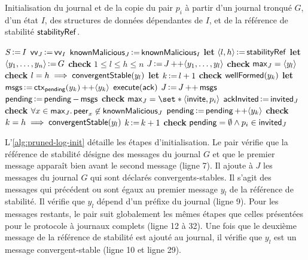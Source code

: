 \begin{algorithm}[ht]
\caption[Initialisation à partir d'un journal tronqué et d'un état]{Initialisation du journal et de la copie du pair $p_i$ à partir d'un journal tronqué $G$, d'un état $I$, des structures de données dépendantes de $I$, et de la référence de stabilité $\trm{stabilityRef}$.}\label{alg:pruned-log-init}
\begin{algorithmic}[1]
    \State $S \assign I$
    \State $\trm{vv}_J \assign \trm{vv}_I$
    \State $\trm{knownMalicious}_J \assign \trm{knownMalicious}_I$
    \State \textbf{let} $\tuple*{l,h} \assign \trm{stabilityRef}$
    \State \textbf{let} $\tuple*{y_1, \dotsc, y_n} \assign G$
    \State \textbf{check} $1 \leq l \leq h \leq n$
    \State $J \assign J \lappend \tuple*{y_1,\dotsc,y_l}$
    \State \textbf{check} $\trm{max}_J = \tuple*{y_l}$
    \State \textbf{check} $l = h \implies \trm{convergentStable}(y_l)$
    \State \textbf{let} $k \assign l + 1$
        \State \textbf{check} $\trm{wellFormed}(y_k)$
            \State \textbf{let} $\trm{msgs} \assign \trm{ctx}_{\trm{pending}}(y_k) \lappend \tuple*{y_k}$
                \State $\trm{execute}(\trm{ack})$
            \EndIf
            \State $J \assign J \lappend \trm{msgs}$
            \State $\trm{pending} \assign \trm{pending} \sminus \trm{msgs}$
                \State \textbf{check} $\trm{max}_J = \set*{\tuple*{\trm{invite}, p_i}}$
                \State $\trm{ackInvited} \assign \trm{invited}_J$
            \EndIf
            \State \textbf{check} $\forall x \in \trm{max}_J \qsep \trm{peer}_x \not\in \trm{knownMalicious}_J$
        \Else
            \State $\trm{pending} \assign \trm{pending} \lappend \tuple*{y_k}$
        \EndIf
        \State \textbf{check} $k = h \implies \trm{convergentStable}(y_l)$
        \State $k \assign k + 1$
    \EndWhile
    \State \textbf{check} $\trm{pending} = \emptyset \land p_i \in \trm{invited}_J$
\EndProcedure
\end{algorithmic}
\end{algorithm}

\clearpage

L'\autoref{alg:pruned-log-init} détaille les étapes d'initialisation.
Le pair vérifie que la référence de stabilité désigne des messages du journal $G$ et que le premier message apparaît bien avant le second message (ligne 7).
Il ajoute à $J$ les messages du journal $G$ qui sont déclarés convergents-stables.
Il s'agit des messages qui précédent ou sont égaux au premier message $y_l$ de la référence de stabilité.
Il vérifie que $y_l$ dépend d'un préfixe du journal (ligne 9).
Pour les messages restants, le pair suit globalement les mêmes étapes que celles présentées pour le protocole à journaux complets (ligne 12 à 32).
Une fois que le deuxième message de la référence de stabilité est ajouté au journal, il vérifie que $y_l$ est un message convergent-stable (ligne 10 et ligne 29).

